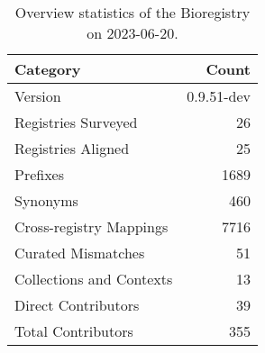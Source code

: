 \begin{table}
\caption{Overview statistics of the Bioregistry on 2023-06-20.}
\label{tab:bioregistry-summary}
\begin{tabular}{lr}
\toprule
Category & Count \\
\midrule
Version & 0.9.51-dev \\
Registries Surveyed & 26 \\
Registries Aligned & 25 \\
Prefixes & 1689 \\
Synonyms & 460 \\
Cross-registry Mappings & 7716 \\
Curated Mismatches & 51 \\
Collections and Contexts & 13 \\
Direct Contributors & 39 \\
Total Contributors & 355 \\
\bottomrule
\end{tabular}
\end{table}
